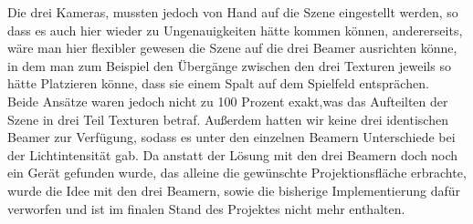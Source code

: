Die drei Kameras, mussten jedoch von Hand auf die Szene eingestellt werden, so dass es auch hier wieder zu Ungenauigkeiten hätte kommen können, andererseits, wäre man hier flexibler gewesen die Szene auf die drei Beamer ausrichten könne, in dem man zum Beispiel den Übergänge zwischen den drei Texturen jeweils so hätte Platzieren könne, dass sie einem Spalt auf dem Spielfeld entsprächen.\\ 
Beide Ansätze waren jedoch nicht zu 100 Prozent exakt,was das Aufteilten der Szene in drei Teil Texturen betraf. Außerdem hatten wir keine drei identischen Beamer zur Verfügung, sodass es unter den einzelnen Beamern Unterschiede bei der Lichtintensität gab.
Da anstatt der Lösung mit den drei Beamern doch noch ein Gerät gefunden wurde, das alleine die gewünschte Projektionsfläche erbrachte, wurde die Idee mit den drei Beamern, sowie die bisherige Implementierung dafür verworfen und ist im finalen Stand des Projektes nicht mehr enthalten.\\